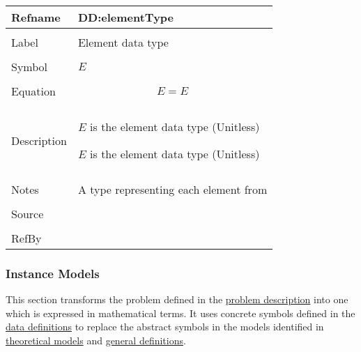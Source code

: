 \documentclass[12pt]{article}
\begin{document}
\vspace{\baselineskip}
\noindent
\begin{minipage}{\textwidth}
\begin{tabular}{>{\raggedright}p{}>{\raggedright\arraybackslash}p{}}
\toprule \textbf{Refname} & \textbf{DD:elementType}
\label{DD:elementType}
\\ \midrule \\
Label & Element data type
        
\\ \midrule \\
Symbol & $E$
         
\\ \midrule \\
Equation & \begin{displaymath}
           E=E
           \end{displaymath}
\\ \midrule \\
Description & \begin{symbDescription}
              \item{$E$ is the element data type (Unitless)}
              \item{$E$ is the element data type (Unitless)}
              \end{symbDescription}
\\ \midrule \\
Notes & A type representing each element from \cite{elemListWiki}
        
\\ \midrule \\
Source & \cite{smithChemSpec}
         
\\ \midrule \\
RefBy & 
\\ \bottomrule
\end{tabular}
\end{minipage}
\subsubsection{Instance Models}
\label{Sec:IMs}
This section transforms the problem defined in the \hyperref[Sec:ProbDesc]{problem description} into one which is expressed in mathematical terms. It uses concrete symbols defined in the \hyperref[Sec:DDs]{data definitions} to replace the abstract symbols in the models identified in \hyperref[Sec:TMs]{theoretical models} and \hyperref[Sec:GDs]{general definitions}.
\end{document}

